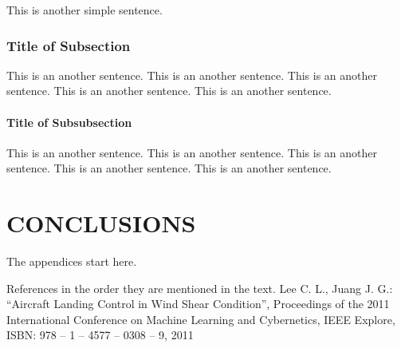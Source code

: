 \documentclass[12pt]{report}
\begin{document}
This is another simple sentence.

\subsection{Title of Subsection}

This is an another sentence. This is an another sentence. This is an another sentence. This is an another sentence. 
This is an another sentence.

\subsubsection{Title of Subsubsection}

This is an another sentence. This is an another sentence. This is an another sentence. This is an another sentence. 
This is an another sentence.

\chapter{CONCLUSIONS}



The appendices start here.

\begin{thebibliography}{9}
 References in the order they are mentioned in the text.
 Lee C. L., Juang J. G.: “Aircraft Landing Control in Wind Shear Condition”,
Proceedings of the 2011 International Conference on Machine Learning and
Cybernetics, IEEE Explore, ISBN: 978 – 1 – 4577 – 0308 – 9, 2011

\end{thebibliography}
\end{document}
